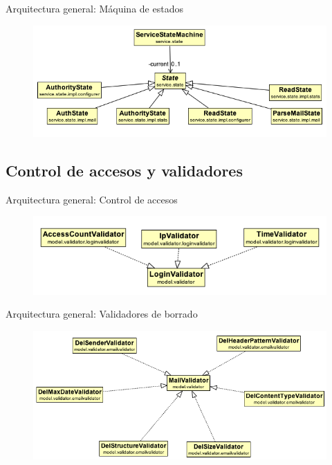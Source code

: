 \documentclass{beamer}
\begin{document}
\begin{frame}{Arquitectura general: Máquina de estados}
\begin{figure}[H]
\begin{center}
\includegraphics[scale=0.52]{./images/Estados.png}
\label{modelado}
\end{center}
\end{figure}
\end{frame}


\subsection{Control de accesos y validadores}

\begin{frame}{Arquitectura general: Control de accesos}
\begin{figure}[H]
\begin{center}
\includegraphics[scale=0.6]{./images/Validators.png}
\label{modelado}
\end{center}
\end{figure}
\end{frame}

\begin{frame}{Arquitectura general: Validadores de borrado}
\begin{figure}[H]
\begin{center}
\includegraphics[scale=0.5]{./images/NotDelValidators.png}
\label{modelado}
\end{center}
\end{figure}
\end{frame}
\end{document}
